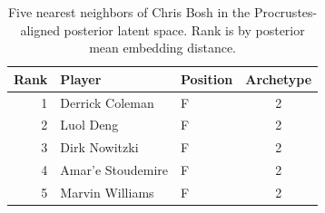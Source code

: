 \begin{table}[htbp]
  \centering\small
  \begin{tabular}{rllc}
    \toprule
    Rank & Player & Position & Archetype \\
    \midrule
    1 & Derrick Coleman & F & 2 \\
    2 & Luol Deng & F & 2 \\
    3 & Dirk Nowitzki & F & 2 \\
    4 & Amar'e Stoudemire & F & 2 \\
    5 & Marvin Williams & F & 2 \\
    \bottomrule
  \end{tabular}
  \caption{Five nearest neighbors of Chris Bosh in the Procrustes-aligned posterior latent space. Rank is by posterior mean embedding distance.}
  \label{tab:Chris_Bosh_neighbors}
\end{table}

